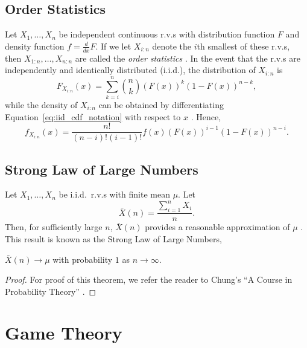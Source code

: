 \subsection{Order Statistics} %
\label{sub:order_statistics_notation}
Let $X_1, \ldots, X_n$ be independent continuous r.v.s with distribution function $F$ and density function $f= \frac{d}{dx}F$. If we let $X_{i:n}$ denote the $i$th smallest of these r.v.s, then $X_{1:n}, \ldots,X_{n:n}$ are called the \emph{order statistics} \cite{Arnold08,David03}. In the event that the r.v.s are independently and identically distributed (i.i.d.), the distribution of $X_{i:n}$ is
\begin{equation}
	\label{eq:iid_cdf_notation}
	F_{X_{i:n}}(x) = \sum_{k=i}^{n} \binom{n}{k} (F(x))^k (1-F(x))^{n-k},
\end{equation}
while the density of $X_{i:n}$ can be obtained by differentiating Equation~\eqref{eq:iid_cdf_notation} with respect to $x$ \cite{Ross10}. Hence,
\begin{equation}
	\label{eq:iid_pdf_notation}
	f_{X_{i:n}}(x) = \frac{n!}{(n-i)!(i-1)!} f(x) (F(x))^{i-1} (1-F(x))^{n-i}.
\end{equation}

\subsection{Strong Law of Large Numbers} %
\label{sub:strong_law_of_large_numbers_notation}
Let $X_1,\ldots,X_n$ be i.i.d.~r.v.s with finite mean $\mu$. Let
\begin{equation*}
  \bar{X}(n) = \frac{\sum_{i=1}^n X_i}{n}.
\end{equation*}
Then, for sufficiently large $n$, $\bar{X}(n)$ provides a reasonable approximation of $\mu$ \cite{LawChapter42007}. This result is known as the Strong Law of Large Numbers,
\begin{thm}
$\bar{X}(n)\rightarrow\mu$ with probability $1$ as $n\rightarrow\infty$.
\end{thm}
\begin{proof}
For proof of this theorem, we refer the reader to Chung's ``A Course in Probability Theory'' \cite{Chung2001}.
\end{proof}

\section{Game Theory} %
\label{sec:theory_of_games_notation}


